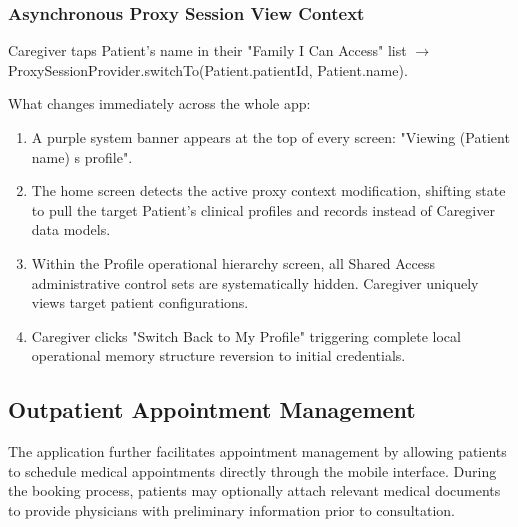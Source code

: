 \subsubsection{Asynchronous Proxy Session View Context}
Caregiver taps Patient's name in their "Family I Can Access" list $\rightarrow$ ProxySessionProvider.switchTo(Patient.patientId, Patient.name).

What changes immediately across the whole app:
\begin{enumerate}
    \item A purple system banner appears at the top of every screen: "Viewing (Patient name) s profile".
    \item The home screen detects the active proxy context modification, shifting state to pull the target Patient's clinical profiles and records instead of Caregiver data models.
    \item Within the Profile operational hierarchy screen, all Shared Access administrative control sets are systematically hidden. Caregiver uniquely views target patient configurations.
    \item Caregiver clicks "Switch Back to My Profile" triggering complete local operational memory structure reversion to initial credentials.
\end{enumerate}

\subsection{Outpatient Appointment Management}
The application further facilitates appointment management by allowing patients to schedule medical appointments directly through the mobile interface. During the booking process, patients may optionally attach relevant medical documents to provide physicians with preliminary information prior to consultation.

